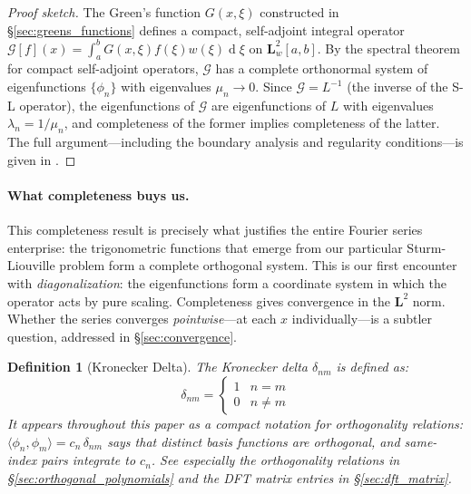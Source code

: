 \documentclass[12pt,a4paper]{report}
\DeclareMathOperator{\deriv}{d}
\theoremstyle{thms}
\theoremstyle{defns}
\newtheorem{definition}{Definition}[section]
\begin{document}
\begin{proof}[Proof sketch]
    The Green's function $G(x, \xi)$ constructed in \S\ref{sec:greens_functions} defines a compact, self-adjoint integral operator $\mathcal{G}[f](x) = \int_a^b G(x, \xi)f(\xi)w(\xi)\deriv{\xi}$ on $\mathbf{L}^2_w[a, b]$. By the spectral theorem for compact self-adjoint operators, $\mathcal{G}$ has a complete orthonormal system of eigenfunctions $\{\phi_n\}$ with eigenvalues $\mu_n \to 0$. Since $\mathcal{G} = L^{-1}$ (the inverse of the S-L operator), the eigenfunctions of $\mathcal{G}$ are eigenfunctions of $L$ with eigenvalues $\lambda_n = 1/\mu_n$, and completeness of the former implies completeness of the latter. The full argument—including the boundary analysis and regularity conditions—is given in \cite{courant_hilbert}.
\end{proof}

\paragraph{What completeness buys us.} This completeness result is precisely what justifies the entire Fourier series enterprise: the trigonometric functions that emerge from our particular Sturm-Liouville problem form a complete orthogonal system. This is our first encounter with \textit{diagonalization}: the eigenfunctions form a coordinate system in which the operator acts by pure scaling. Completeness gives convergence in the $\mathbf{L}^2$ norm. Whether the series converges \textit{pointwise}—at each $x$ individually—is a subtler question, addressed in \S\ref{sec:convergence}.

\begin{definition}[Kronecker Delta]
    The Kronecker delta $\delta_{nm}$ is defined as:
    \begin{equation}
        \delta_{nm} = \begin{cases} 1 & n = m \\ 0 & n \neq m \end{cases}
    \end{equation}
    It appears throughout this paper as a compact notation for orthogonality relations: $\langle \phi_n, \phi_m \rangle = c_n\,\delta_{nm}$ says that distinct basis functions are orthogonal, and same-index pairs integrate to $c_n$. See especially the orthogonality relations in \S\ref{sec:orthogonal_polynomials} and the DFT matrix entries in \S\ref{sec:dft_matrix}.
    \label{def:kronecker}
\end{definition}
\end{document}
